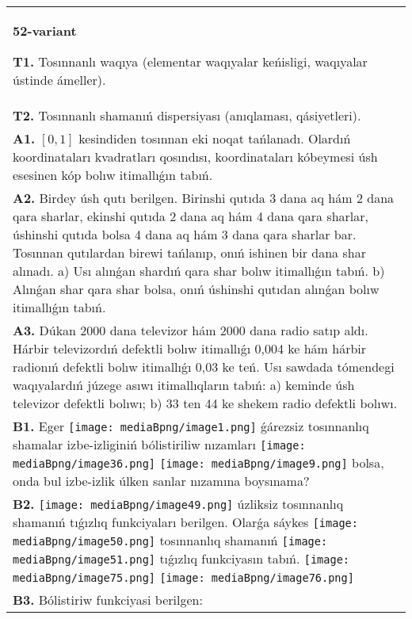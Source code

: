 \documentclass{article}
\begin{document}
\begin{tabular}{m{17cm}}
\textbf{52-variant}
\newline

\textbf{T1.} Tosınnanlı waqıya (elementar waqıyalar keńisligi, waqıyalar ústinde ámeller).
 \\
\textbf{T2.} Tosınnanlı shamanıń dispersiyası (anıqlaması, qásiyetleri).
 \\
\textbf{A1.} $\left[ 0,1 \right]$ kesindiden tosınnan eki noqat tańlanadı. Olardıń koordinataları kvadratları qosındısı, koordinataları kóbeymesi úsh esesinen kóp bolıw itimallıǵın tabıń.
 \\
\textbf{A2.} Birdey úsh qutı berilgen. Birinshi qutıda 3 dana aq hám 2 dana qara sharlar, ekinshi qutıda 2 dana aq hám 4 dana qara sharlar, úshinshi qutıda bolsa 4 dana aq hám 3 dana qara sharlar bar. Tosınnan qutılardan birewi tańlanıp, onıń ishinen bir dana shar alınadı. a) Usı alınǵan shardıń qara shar bolıw itimallıǵın tabıń. b) Alınǵan shar qara shar bolsa, onıń úshinshi qutıdan alınǵan bolıw itimallıǵın tabıń.
 \\
\textbf{A3.} Dúkan 2000 dana televizor hám 2000 dana radio satıp aldı. Hárbir televizordıń defektli bolıw itimallıǵı 0,004 ke hám hárbir radionıń defektli bolıw itimallıǵı 0,03 ke teń. Usı sawdada tómendegi waqıyalardıń júzege asıwı itimallıqların tabıń: a) keminde úsh televizor defektli bolıwı; b) 33 ten 44 ke shekem radio defektli bolıwı.
 \\
\textbf{B1.} Eger \texttt{[image: mediaBpng/image1.png]} ǵárezsiz tosınnanlıq shamalar izbe-izliginiń bólistiriliw nızamları
\texttt{[image: mediaBpng/image36.png]} \texttt{[image: mediaBpng/image9.png]}
bolsa, onda bul izbe-izlik úlken sanlar nızamına boysınama?
 \\
\textbf{B2.} \texttt{[image: mediaBpng/image49.png]} úzliksiz tosınnanlıq shamanıń tıǵızlıq funkciyaları berilgen. Olarǵa sáykes \texttt{[image: mediaBpng/image50.png]} tosınnanlıq shamanıń \texttt{[image: mediaBpng/image51.png]} tıǵızlıq funkciyasın tabıń. \texttt{[image: mediaBpng/image75.png]} \texttt{[image: mediaBpng/image76.png]}
 \\
\textbf{B3.} 
Bólistiriw funkciyasi berilgen: \(\mathbf{F}\mathbf{(}\mathbf{x}\mathbf{)}\mathbf{=}\left\{ \begin{matrix}

\end{matrix}
\end{tabular}
\end{document}
